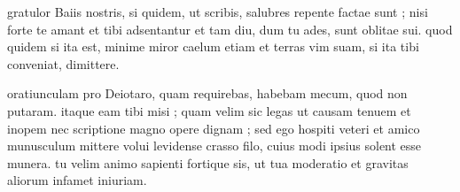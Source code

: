 


 gratulor Baiis nostris, si quidem, ut scribis, salubres repente factae sunt ; nisi forte te amant et tibi adsentantur et tam diu, dum tu ades, sunt oblitae sui. quod quidem si ita est, minime miror caelum etiam et terras vim suam, si ita tibi conveniat, dimittere.

 oratiunculam pro Deiotaro, quam requirebas, habebam mecum, quod non putaram. itaque eam tibi misi ; quam velim sic legas ut causam tenuem et inopem nec scriptione magno opere dignam ; sed ego hospiti veteri et amico munusculum mittere volui levidense crasso filo, cuius modi ipsius solent esse munera. tu velim animo sapienti fortique sis, ut tua moderatio et gravitas aliorum infamet iniuriam.
